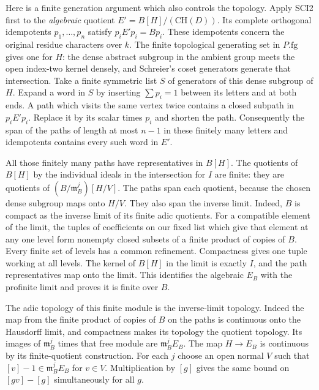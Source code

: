 Here is a finite generation argument which also controls the topology.
Apply SCI2 first to the \emph{algebraic} quotient
$E'=B[H]/(\mathrm{CH}(D))$. Its complete orthogonal idempotents
$p_1,\ldots,p_n$ satisfy $p_iE'p_i=Bp_i$. These idempotents
concern the original residue characters over $k$.
The finite topological generating set in $P.\mathrm{fg}$ gives
one for $H$: the dense abstract subgroup in the ambient group
meets the open index-two kernel densely, and Schreier's coset
generators generate that intersection. Take a finite symmetric
list $S$ of generators of this dense subgroup of $H$.
Expand a word in $S$ by inserting $\sum p_i=1$ between its
letters and at both ends. A path which visits the same vertex
twice contains a closed subpath in $p_iE'p_i$. Replace it by
its scalar times $p_i$ and shorten the path. Consequently the
span of the paths of length at most $n-1$ in these finitely many
letters and idempotents contains every such word in $E'$.

All those finitely many paths have representatives in $B[H]$.
The quotients of $B[H]$ by the individual ideals in the
intersection for $I$ are finite: they are quotients of
$(B/\mathfrak m_B^j)[H/V]$. The paths span each quotient,
because the chosen dense subgroup maps onto $H/V$. They also
span the inverse limit. Indeed, $B$ is compact as the inverse
limit of its finite adic quotients. For a compatible element of
the limit, the tuples of coefficients on our fixed list which
give that element at any one level form nonempty closed subsets
of a finite product of copies of $B$. Every finite set of levels
has a common refinement. Compactness gives one tuple working
at all levels. The kernel of $B[H]$ in the limit is exactly $I$,
and the path representatives map onto the limit.
This identifies the algebraic $E_B$ with the profinite limit
and proves it is finite over $B$.

The adic topology of this finite module is the inverse-limit
topology. Indeed the map from the finite product of copies of
$B$ on the paths is continuous onto the Hausdorff limit, and
compactness makes its topology the quotient topology.
Its images of $\mathfrak m_B^j$ times that free module are
$\mathfrak m_B^j E_B$. The map $H\to E_B$ is continuous by
its finite-quotient construction. For each $j$ choose an open
normal $V$ such that $[v]-1\in\mathfrak m_B^jE_B$ for $v\in V$.
Multiplication by $[g]$ gives the same bound on $[gv]-[g]$
simultaneously for all $g$.

